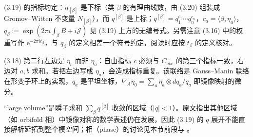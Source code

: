 \begin{yizhu}[易错点]
(3.19) 的指标约定：$n_{[\beta]}$ 是下标（类 $\beta$ 的有理曲线数，由 (3.20) 组装成 Gromov--Witten 不变量 $N_{[\beta]}$），而 $q^{[\beta]}$ 是上标；$q^{[\beta]}=q_1^{c_1}\cdots q_n^{c_n}$，$c_a=\langle\beta,\eta_a\rangle$，$q_{\beta}:=\exp(2\pi i\int_{\beta}B+i\mathcal{J})$ 见 (3.19) 上方的无编号式。另需注意 (3.16) 中的权重写作 $\mathrm{e}^{-2\pi i t_{\beta}}$，与 $q_{\beta}$ 的定义相差一个符号约定，阅读时应按 $t_{\beta}$ 的定义核对。
\end{yizhu}

\begin{yizhu}[易错点]
(3.18) 第二行左边是 $\eta_c$ 而非 $\eta_a$：自由指标 $c$ 必须与 $C_{abc}$ 的第三个指标一致，右边对 $a,b$ 求和。若把左边写成 $\eta_a$，会造成指标重复。该联络是 Gauss--Manin 联络在形变子环上的实现，$q_a$ 是平坦坐标，$\nabla_A\eta_0=\sum_a\eta_a\otimes dq_a/q_a$ 即镜像映射的微分。
\end{yizhu}

\begin{yizhu}[含糊点]
“large volume”是瞬子求和 $\sum_{\beta}q^{[\beta]}$ 收敛的区域（$|q|<1$）。原文指出其他区域（如 orbifold 相）中镜像对称的数学表述仍在发展，因此 (3.19) 的 $q$ 展开不能直接解析延拓到整个模空间；相（phase）的讨论见本节前段与 \cite{ref42,ref43,ref44}。
\end{yizhu}


